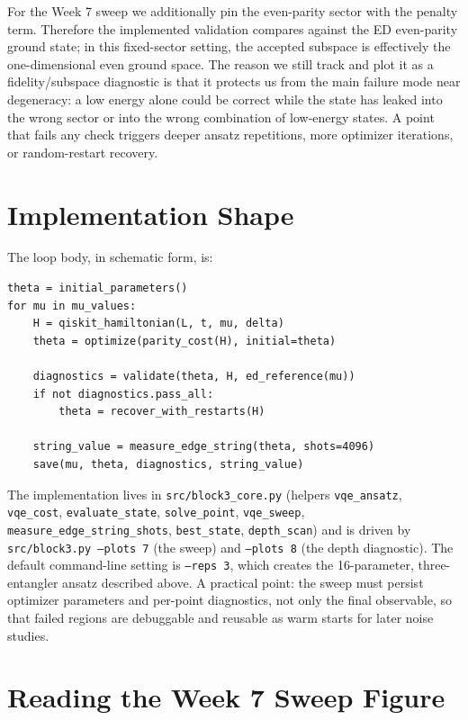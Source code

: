 \documentclass[11pt]{article}
\begin{document}
For the Week 7 sweep we additionally pin the even-parity sector with the penalty term. Therefore the implemented validation compares against the ED even-parity ground state; in this fixed-sector setting, the accepted subspace is effectively the one-dimensional even ground space. The reason we still track and plot it as a fidelity/subspace diagnostic is that it protects us from the main failure mode near degeneracy: a low energy alone could be correct while the state has leaked into the wrong sector or into the wrong combination of low-energy states. A point that fails any check triggers deeper ansatz repetitions, more optimizer iterations, or random-restart recovery.

\section{Implementation Shape}

The loop body, in schematic form, is:
\begin{verbatim}
theta = initial_parameters()
for mu in mu_values:
    H = qiskit_hamiltonian(L, t, mu, delta)
    theta = optimize(parity_cost(H), initial=theta)

    diagnostics = validate(theta, H, ed_reference(mu))
    if not diagnostics.pass_all:
        theta = recover_with_restarts(H)

    string_value = measure_edge_string(theta, shots=4096)
    save(mu, theta, diagnostics, string_value)
\end{verbatim}

\begin{sloppypar}
The implementation lives in \texttt{src/block3\_core.py} (helpers \texttt{vqe\_ansatz}, \texttt{vqe\_cost}, \texttt{evaluate\_state}, \texttt{solve\_point}, \texttt{vqe\_sweep}, \texttt{measure\_edge\_string\_shots}, \texttt{best\_state}, \texttt{depth\_scan}) and is driven by \texttt{src/block3.py --plots 7} (the sweep) and \texttt{--plots 8} (the depth diagnostic). The default command-line setting is \texttt{--reps 3}, which creates the 16-parameter, three-entangler ansatz described above. A practical point: the sweep must persist optimizer parameters and per-point diagnostics, not only the final observable, so that failed regions are debuggable and reusable as warm starts for later noise studies.
\end{sloppypar}

\section{Reading the Week 7 Sweep Figure}
\end{document}
